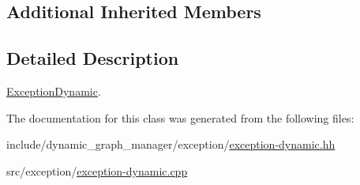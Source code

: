 \subsection*{Additional Inherited Members}


\subsection{Detailed Description}
\hyperlink{classdynamic__graph_1_1ExceptionDynamic}{Exception\+Dynamic}. 

The documentation for this class was generated from the following files\+:\begin{DoxyCompactItemize}
\item 
include/dynamic\+\_\+graph\+\_\+manager/exception/\hyperlink{exception-dynamic_8hh}{exception-\/dynamic.\+hh}\item 
src/exception/\hyperlink{exception-dynamic_8cpp}{exception-\/dynamic.\+cpp}\end{DoxyCompactItemize}
